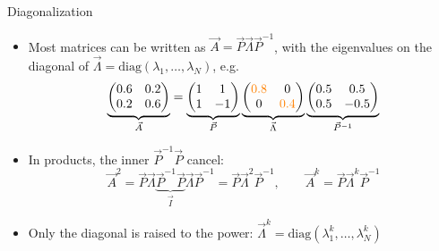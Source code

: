 \documentclass[11pt,compress,t,notes=noshow, xcolor=table]{beamer}
\begin{document}
\begin{frame}{Diagonalization}

\vfill

\begin{itemize}
  \item Most matrices can be written as $\vec A = \vec P \vec \Lambda \vec P^{-1}$, with the eigenvalues on the diagonal of $\vec \Lambda = \mathrm{diag}(\lambda_1, \ldots, \lambda_N)$, e.g.
        \[ \underbrace{\begin{pmatrix} 0.6 & 0.2 \\ 0.2 & 0.6 \end{pmatrix}}_{\vec A}
           = \underbrace{\begin{pmatrix} 1 & 1 \\ 1 & -1 \end{pmatrix}}_{\vec P}
             \underbrace{\begin{pmatrix} \textcolor{orange}{0.8} & 0 \\ 0 & \textcolor{orange}{0.4} \end{pmatrix}}_{\vec \Lambda}
             \underbrace{\begin{pmatrix} 0.5 & 0.5 \\ 0.5 & -0.5 \end{pmatrix}}_{\vec P^{-1}} \]
  \item In products, the inner $\vec P^{-1} \vec P$ cancel:
        \[ \vec A^2 = \vec P \vec \Lambda \underbrace{\vec P^{-1} \vec P}_{\vec I} \vec \Lambda \vec P^{-1} = \vec P \vec \Lambda^2 \vec P^{-1},
           \qquad \vec A^k = \vec P \vec \Lambda^k \vec P^{-1} \]
  \item Only the diagonal is raised to the power: $\vec \Lambda^k = \mathrm{diag}(\lambda_1^k, \ldots, \lambda_N^k)$
\end{itemize}

\vfill

\end{frame}
\end{document}
